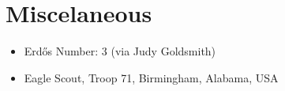\documentclass{cv}
\begin{document}

\section*{Miscelaneous}
\begin{itemize}
	\item Erdős Number: 3 (via Judy Goldsmith)
	\item Eagle Scout, Troop 71, Birmingham, Alabama, USA
\end{itemize}
\end{document}
